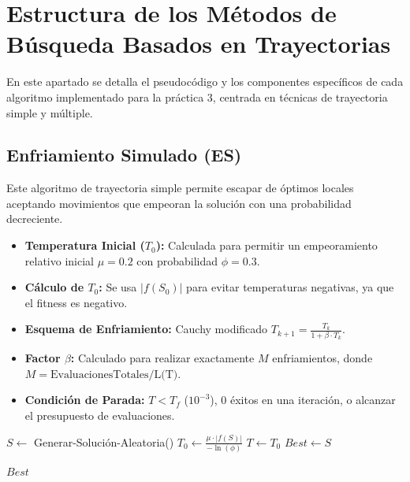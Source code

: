 \newpage
\section{Estructura de los Métodos de Búsqueda Basados en Trayectorias}
\label{sec:algoritmos}

En este apartado se detalla el pseudocódigo y los componentes específicos de cada 
algoritmo implementado para la práctica 3, centrada en técnicas de trayectoria 
simple y múltiple.

\subsection{Enfriamiento Simulado (ES)}

Este algoritmo de trayectoria simple permite escapar de óptimos locales aceptando 
movimientos que empeoran la solución con una probabilidad decreciente.

\begin{itemize}[noitemsep]
    \item \textbf{Temperatura Inicial ($T_0$):} Calculada para permitir un empeoramiento 
    relativo inicial $\mu=0.2$ con probabilidad $\phi=0.3$.
    \item \textbf{C\'{a}lculo de $T_0$:} Se usa $|f(S_0)|$ para evitar temperaturas negativas, ya que el fitness es negativo.
    \item \textbf{Esquema de Enfriamiento:} Cauchy modificado $T_{k+1} = \frac{T_k}{1 + \beta \cdot T_k}$.
    \item \textbf{Factor $\beta$:} Calculado para realizar exactamente $M$ enfriamientos, 
    donde $M = \text{EvaluacionesTotales} / \text{L(T)}$.
    \item \textbf{Condición de Parada:} $T < T_f$ ($10^{-3}$), 0 éxitos en una iteración, 
    o alcanzar el presupuesto de evaluaciones.
\end{itemize}

\begin{algorithm}[H]
\SetAlgoLined
{}

$S \leftarrow$ Generar-Solución-Aleatoria()\;
$T_0 \leftarrow \frac{\mu \cdot |f(S)|}{-\ln(\phi)}$\;
$T \leftarrow T_0$\;
$Best \leftarrow S$\;

\Return $Best$\;
\caption{Enfriamiento Simulado (ES)}
\label{alg:es}
\end{algorithm}

